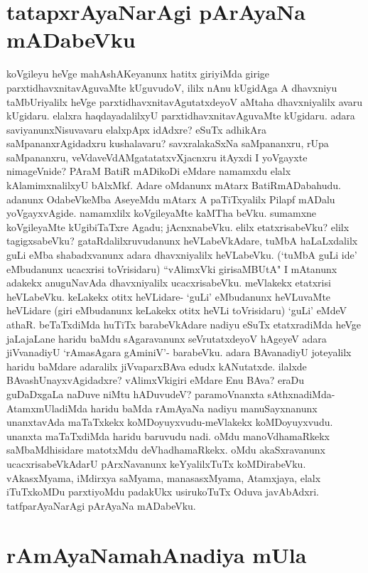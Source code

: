 \section*{tatapxrAyaNarAgi pArAyaNa mADabeVku} 

koVgileyu heVge mahAshAKeyanunx hatitx giriyiMda girige parxtidhavxnitavAguvaMte kUguvudoV, ililx nAnu kUgidAga A dhavxniyu taMbUriyalilx heVge parxtidhavxnitavAgutatxdeyoV aMtaha dhavxniyalilx avaru kUgidaru. elalxra haqdayadalilxyU parxtidhavxnitavAguvaMte kUgidaru. adara saviyanunxNisuvavaru elalxpApx idAdxre? eSuTx adhikAra saMpananxrAgidadxru kushalavaru? savxralakaSxNa saMpananxru, rUpa saMpananxru, veVdaveVdAMgatatatxvXjacnxru itAyxdi I yoVgayxte nimageVnide? PAraM BatiR mADikoDi eMdare namamxdu elalx kAlamimxnalilxyU bAlxMkf. Adare oMdanunx mAtarx BatiRmADabahudu. adanunx OdabeVkeMba AseyeMdu mAtarx A paTiTxyalilx Pilapf mADalu yoVgayxvAgide. namamxlilx koVgileyaMte kaMTha beVku. sumamxne koVgileyaMte kUgibiTaTxre Agadu; jAcnxnabeVku. elilx etatxrisabeVku? elilx tagigxsabeVku? gataRdalilxruvudanunx heVLabeVkAdare, tuMbA haLaLxdalilx guLi eMba shabadxvanunx adara dhavxniyalilx heVLabeVku. (`tuMbA guLi ide' eMbudanunx ucacxrisi toVrisidaru) ``vAlimxVki girisaMBUtA" I mAtanunx adakekx anuguNavAda dhavxniyalilx ucacxrisabeVku. meVlakekx etatxrisi heVLabeVku. keLakekx otitx heVLidare- `guLi' eMbudanunx heVLuvaMte heVLidare (giri eMbudanunx keLakekx otitx heVLi toVrisidaru) `guLi' eMdeV athaR. beTaTxdiMda huTiTx barabeVkAdare nadiyu eSuTx etatxradiMda heVge jaLajaLane haridu baMdu sAgaravanunx seVrutatxdeyoV hAgeyeV adara jiVvanadiyU `rAmasAgara gAminiV'- barabeVku. adara BAvanadiyU joteyalilx haridu baMdare adaralilx jiVvaparxBAva edudx kANutatxde. ilalxde BAvashUnayxvAgidadxre? vAlimxVkigiri eMdare Enu BAva? eraDu guDaDxgaLa naDuve niMtu hADuvudeV? paramoVnanxta sAthxnadiMda-AtamxmUladiMda haridu baMda rAmAyaNa nadiyu manuSayxnanunx unanxtavAda maTaTxkekx koMDoyuyxvudu-meVlakekx koMDoyuyxvudu. unanxta maTaTxdiMda haridu baruvudu nadi. oMdu manoVdhamaRkekx saMbaMdhisidare matotxMdu deVhadhamaRkekx. oMdu akaSxravanunx ucacxrisabeVkAdarU pArxNavanunx keYyalilxTuTx koMDirabeVku. vAkasxMyama, iMdirxya saMyama, manasasxMyama, Atamxjaya, elalx iTuTxkoMDu parxtiyoMdu padakUkx usirukoTuTx Oduva javAbAdxri. tatfparAyaNarAgi pArAyaNa mADabeVku. 

\section*{rAmAyaNamahAnadiya mUla} 

